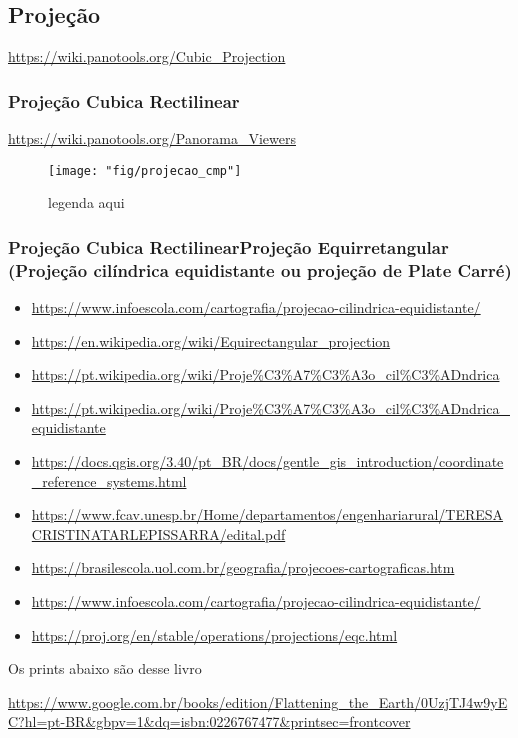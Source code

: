 \subsection{Projeção}
\url{https://wiki.panotools.org/Cubic_Projection}

\subsubsection{Projeção Cubica Rectilinear}

\url{https://wiki.panotools.org/Panorama_Viewers}

\begin{figure}[tbh]
	\centering
	\texttt{[image: "fig/projecao\_cmp"]}
	\caption{legenda aqui}
	\label{fig:projecao_cmp}
\end{figure}

\subsubsection{Projeção Cubica RectilinearProjeção Equirretangular (Projeção cilíndrica equidistante ou projeção de Plate Carré)}

\begin{itemize}
	\item \url{https://www.infoescola.com/cartografia/projecao-cilindrica-equidistante/}
	\item \url{https://en.wikipedia.org/wiki/Equirectangular_projection}
	\item \url{https://pt.wikipedia.org/wiki/Proje%C3%A7%C3%A3o_cil%C3%ADndrica}
	\item \url{https://pt.wikipedia.org/wiki/Proje%C3%A7%C3%A3o_cil%C3%ADndrica_equidistante}
	\item \url{https://docs.qgis.org/3.40/pt_BR/docs/gentle_gis_introduction/coordinate_reference_systems.html}
	\item \url{https://www.fcav.unesp.br/Home/departamentos/engenhariarural/TERESACRISTINATARLEPISSARRA/edital.pdf}
	\item \url{https://brasilescola.uol.com.br/geografia/projecoes-cartograficas.htm}
	\item \url{https://www.infoescola.com/cartografia/projecao-cilindrica-equidistante/}
	\item \url{https://proj.org/en/stable/operations/projections/eqc.html}
\end{itemize}

Os prints abaixo são desse livro

\url{https://www.google.com.br/books/edition/Flattening_the_Earth/0UzjTJ4w9yEC?hl=pt-BR&gbpv=1&dq=isbn:0226767477&printsec=frontcover}

